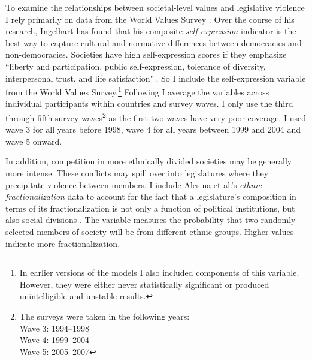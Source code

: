 \documentclass[a4paper]{article}\usepackage[]{graphicx}\usepackage[]{color}
\begin{document}
To examine the relationships between societal-level values and legislative violence I rely primarily on data from the World Values Survey \citeyearpar{WVS2009}. Over the course of his research, Ingelhart has found that his composite {\emph{self-expression}} indicator is the best way to capture cultural and normative differences between democracies and non-democracies. Societies have high self-expression scores if they emphasize ``liberty and participation, public self-expression, tolerance of diversity, interpersonal trust, and life satisfaction" \citep[64]{Inglehart2003}. So I include the self-expression variable from the World Values Survey.\footnote{In earlier versions of the models I also included components of this variable. However, they were either never statistically significant or produced unintelligible and unstable results.} Following \cite{Inglehart2003} I average the variables across individual participants within countries and survey waves. I only use the third through fifth survey waves\footnote{The surveys were taken in the following years: \\ Wave 3: 1994--1998 \\ Wave 4: 1999--2004 \\ Wave 5: 2005--2007} as the first two waves have very poor coverage. I used wave 3 for all years before 1998, wave 4 for all years between 1999 and 2004 and wave 5 onward.

In addition, competition in more ethnically divided societies may be generally more intense. These conflicts may spill over into legislatures where they precipitate violence between members. I include Alesina et al.'s \citeyearpar{Alesina2003} {\emph{ethnic fractionalization}} data to account for the fact that a legislature's composition in terms of its fractionalization is not only a function of political institutions, but also social divisions \citep{Neto1997, Mozaffar2003}. The variable measures the probability that two randomly selected members of society will be from different ethnic groups. Higher values indicate more fractionalization.


\end{document}
